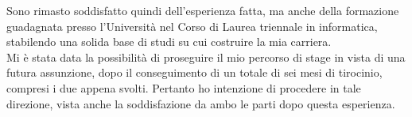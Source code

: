 	Sono rimasto soddisfatto quindi dell'esperienza fatta, ma anche della formazione guadagnata presso l'Università nel Corso di Laurea triennale in informatica, stabilendo una solida base di studi su cui costruire la mia carriera.\\
	
	Mi è stata data la possibilità di proseguire il mio percorso di stage in vista di una futura assunzione, dopo il conseguimento di un totale di sei mesi di tirocinio, compresi i due appena svolti. Pertanto ho intenzione di procedere in tale direzione, vista anche la soddisfazione da ambo le parti dopo questa esperienza.

	
%
%
%
%
% 
%
%
%
%
%
%
%
%
%
%
%


